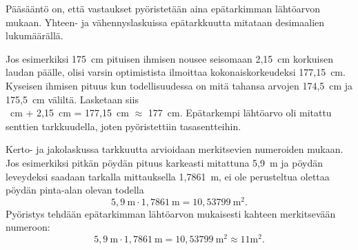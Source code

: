 Pääsääntö on, että vastaukset pyöristetään aina epätarkimman
lähtöarvon mukaan. Yhteen- ja vähennyslaskuissa epätarkkuutta
mitataan desimaalien lukumäärällä.

Jos esimerkiksi 175~cm pituisen ihmisen
nousee seisomaan 2,15~cm korkuisen laudan päälle, olisi varsin
optimistista ilmoittaa kokonaiskorkeudeksi 177,15~cm. Kyseisen ihmisen pituus kun todellisuudessa on mitä tahansa arvojen
174,5~cm ja 175,5~cm väliltä. Lasketaan siis\\
~cm + 2,15~cm = 177,15~cm $\approx$ 177~cm. 
Epätarkempi lähtöarvo oli mitattu senttien tarkkuudella, joten pyöristettiin tasasentteihin.

Kerto- ja jakolaskussa tarkkuutta arvioidaan merkitsevien numeroiden mukaan. Jos esimerkiksi pitkän pöydän pituus karkeasti
mitattuna 5,9~m ja pöydän leveydeksi saadaan tarkalla mittauksella
1,7861~m, ei ole perusteltua olettaa pöydän pinta-alan olevan todella
\[ 5,9~\textrm{m} \cdot 1,7861~\textrm{m} = 10,53799~\textrm{m}^2. \] 
Pyöristys tehdään epätarkimman
lähtöarvon mukaisesti kahteen merkitsevään numeroon:
\[ 5,9~\textrm{m} \cdot 1,7861~\textrm{m} = 10,53799~\textrm{m}^2 \approx 11 \textrm{m}^2.\] 
